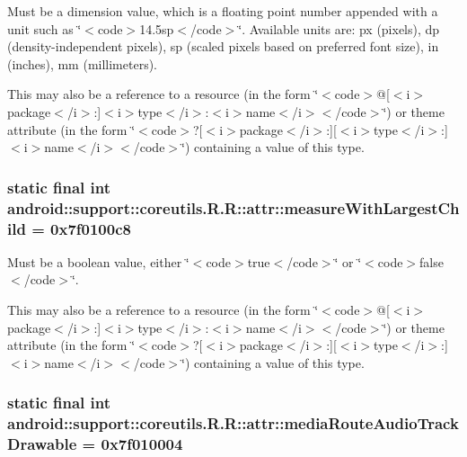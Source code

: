 Must be a dimension value, which is a floating point number appended with a unit such as \char`\"{}$<$code$>$14.5sp$<$/code$>$\char`\"{}. Available units are: px (pixels), dp (density-independent pixels), sp (scaled pixels based on preferred font size), in (inches), mm (millimeters). 

This may also be a reference to a resource (in the form \char`\"{}$<$code$>$@\mbox{[}$<$i$>$package$<$/i$>$:\mbox{]}$<$i$>$type$<$/i$>$:$<$i$>$name$<$/i$>$$<$/code$>$\char`\"{}) or theme attribute (in the form \char`\"{}$<$code$>$?\mbox{[}$<$i$>$package$<$/i$>$:\mbox{]}\mbox{[}$<$i$>$type$<$/i$>$:\mbox{]}$<$i$>$name$<$/i$>$$<$/code$>$\char`\"{}) containing a value of this type. \hypertarget{classandroid_1_1support_1_1coreutils_1_1_r_1_1attr_e56d9dbcaa044bfeae5ef274f1bf0221}{
\subsubsection[{measureWithLargestChild}]{\setlength{\rightskip}{0pt plus 5cm}static final int android::support::coreutils.R.R::attr::measureWithLargestChild = 0x7f0100c8}}
\label{classandroid_1_1support_1_1coreutils_1_1_r_1_1attr_e56d9dbcaa044bfeae5ef274f1bf0221}


Must be a boolean value, either \char`\"{}$<$code$>$true$<$/code$>$\char`\"{} or \char`\"{}$<$code$>$false$<$/code$>$\char`\"{}. 

This may also be a reference to a resource (in the form \char`\"{}$<$code$>$@\mbox{[}$<$i$>$package$<$/i$>$:\mbox{]}$<$i$>$type$<$/i$>$:$<$i$>$name$<$/i$>$$<$/code$>$\char`\"{}) or theme attribute (in the form \char`\"{}$<$code$>$?\mbox{[}$<$i$>$package$<$/i$>$:\mbox{]}\mbox{[}$<$i$>$type$<$/i$>$:\mbox{]}$<$i$>$name$<$/i$>$$<$/code$>$\char`\"{}) containing a value of this type. \hypertarget{classandroid_1_1support_1_1coreutils_1_1_r_1_1attr_3b671f430d91801fc3af3cee6f4ba269}{
\subsubsection[{mediaRouteAudioTrackDrawable}]{\setlength{\rightskip}{0pt plus 5cm}static final int android::support::coreutils.R.R::attr::mediaRouteAudioTrackDrawable = 0x7f010004}}
\label{classandroid_1_1support_1_1coreutils_1_1_r_1_1attr_3b671f430d91801fc3af3cee6f4ba269}


